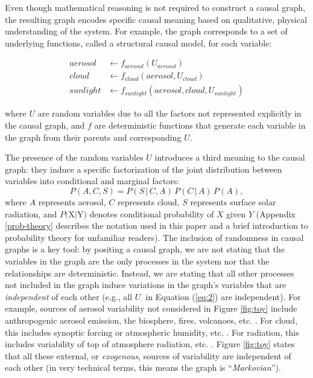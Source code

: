 \documentclass[12pt]{article}
\begin{document}
Even though mathematical reasoning is not required to construct a
causal graph, the resulting graph encodes specific causal meaning
based on qualitative, physical understanding of the system. For
example, the graph corresponds to a set of underlying functions,
called a structural causal model, for each variable:

\begin{align}
  \label{eq:2}
  aerosol &\leftarrow f_{aerosol} (U_{aerosol}) \\
  cloud &\leftarrow f_{cloud} (aerosol, U_{cloud})\\
  sunlight &\leftarrow f_{sunlight} (aerosol, cloud, U_{sunlight})
\end{align}

where $U$ are random variables due to all the factors not represented
explicitly in the causal graph, and $f$ are deterministic functions
that generate each variable in the graph from their parents and
corresponding $U$.

The presence of the random variables $U$ introduces a third meaning to
the causal graph: they induce a specific factorization of the joint
distribution between variables into conditional and marginal factors:
\begin{equation}
  P(A, C, S) = P(S \, | \,C, A) \, P(C \, | \, A) \, P(A),
\end{equation}
where $A$ represents aerosol, $C$ represents cloud, $S$ represents
surface solar radiation, and $P($X$ | $Y$)$ denotes conditional
probability of $X$ given $Y$ (Appendix \ref{prob-theory} describes the notation used in
this paper and a brief introduction to probability theory for
unfamiliar readers). The inclusion of randomness in causal graphs is a
key tool: by positing a causal graph, we are not stating that the
variables in the graph are the only processes in the system nor that the relationships are deterministic. Instead,
we are stating that all other processes not included in the graph
induce variations in the graph's variables that are \emph{independent} of
each other (e.g., all $U_{\cdot}$ in Equation (\ref{eq:2}) are
independent). For example, sources of aerosol variability not
considered in Figure \ref{fig:toy} include anthropogenic aerosol
emission, the biosphere, fires, volcanoes,
etc. \citep[e.g.,][]{Boucher2015}. For cloud, this includes synoptic
forcing or atmospheric humidity,
etc. \citep[e.g.,][]{wallace2006atmospheric}. For radiation, this
includes variability of top of atmosphere radiation,
etc. \citep[e.g.,][]{hartmann2015global}. Figure \ref{fig:toy} states
that all these external, or \textit{exogenous}, sources of variability
are independent of each other (in very technical terms, this means the
graph is ``\textit{Markovian}'').
\end{document}

